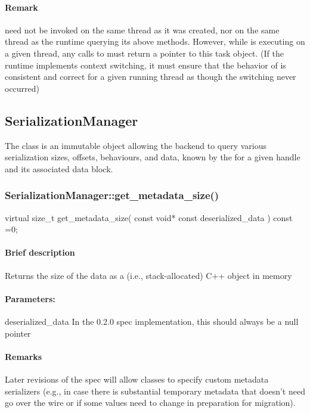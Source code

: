 \paragraph{Remark}  need not be invoked on the same thread as it was created, nor on the
       same thread as the runtime querying its above methods.  However, while  is executing
       on a given thread, any calls to  must return a pointer to
       this task object.  (If the runtime implements context switching, it must ensure that
       the behavior of  is consistent and correct for a given
       running thread as though the switching never occurred)


\subsection{{SerializationManager}}
The class  is an immutable object allowing the backend to query various serialization sizes, offsets,
   behaviours, and data, known by the for a given handle and its associated data block.


\subsubsection{SerializationManager::get\_metadata\_size()}
\begin{CppCode}
    virtual size_t
    get_metadata_size(
      const void* const deserialized_data
    ) const =0;
\end{CppCode}

\paragraph{Brief description} Returns the size of the data as a (i.e., stack-allocated) C++ object in memory
     
\paragraph{Parameters:}
\begin{compactdesc} 
\item[deserialized\_data] In the 0.2.0 spec implementation, this should always be a null pointer
\end{compactdesc}

\paragraph{Remarks} Later revisions of the spec will allow classes to specify custom metadata serializers
       (e.g., in case there is substantial temporary metadata that doesn't need go over the wire or
       if some values need to change in preparation for migration).

